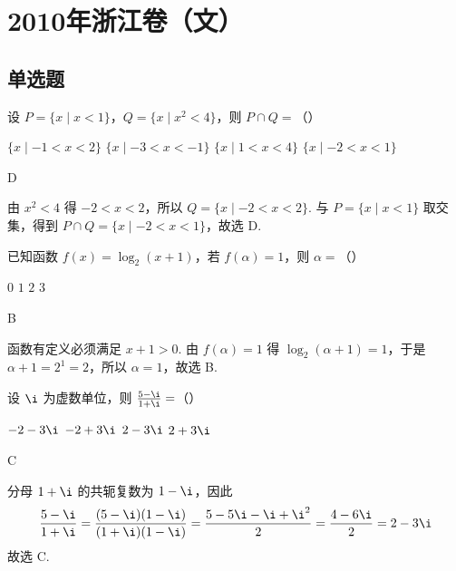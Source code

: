
\chapter{2010年浙江卷（文）}

\section{单选题}

\begin{problem}
设 \(P = \{x \mid x < 1\}\)，\(Q = \{x \mid x^2 < 4\}\)，则 \(P \cap Q =\)（\quad）

\choices
    {\(\{x\mid -1 < x < 2\}\)}
    {\(\{x\mid -3 < x < -1\}\)}
    {\(\{x\mid 1 < x < 4\}\)}
    {\(\{x\mid -2 < x < 1\}\)}

\begin{answer}
D
\end{answer}

\begin{solution}
由 \(x^2<4\) 得 \(-2<x<2\)，所以
\(Q=\{x\mid -2<x<2\}\). 与 \(P=\{x\mid x<1\}\) 取交集，得到
\(P\cap Q=\{x\mid -2<x<1\}\)，故选 D.
\end{solution}
\end{problem}

\begin{problem}
已知函数 \(f(x) = \log_2(x + 1)\)，若 \(f(\alpha) = 1\)，则 \(\alpha =\)（\quad）

\choices
    {\(0\)}
    {\(1\)}
    {\(2\)}
    {\(3\)}

\begin{answer}
B
\end{answer}

\begin{solution}
函数有定义必须满足 \(x+1>0\). 由 \(f(\alpha)=1\) 得
\(\log_2(\alpha+1)=1\)，于是 \(\alpha+1=2^1=2\)，所以
\(\alpha=1\)，故选 B.
\end{solution}
\end{problem}

\begin{problem}
设 \(\i\) 为虚数单位，则 \(\frac{5 - \i}{1 + \i} =\)（\quad）

\choices
    {\(-2 - 3\i\)}
    {\(-2 + 3\i\)}
    {\(2 - 3\i\)}
    {\(2 + 3\i\)}

\begin{answer}
C
\end{answer}

\begin{solution}
分母 \(1+\i\) 的共轭复数为 \(1-\i\)，因此
\[
\frac{5-\i}{1+\i}=\frac{(5-\i)(1-\i)}{(1+\i)(1-\i)}
=\frac{5-5\i-\i+\i^2}{2}
=\frac{4-6\i}{2}=2-3\i
\]
故选 C.
\end{solution}
\end{problem}

